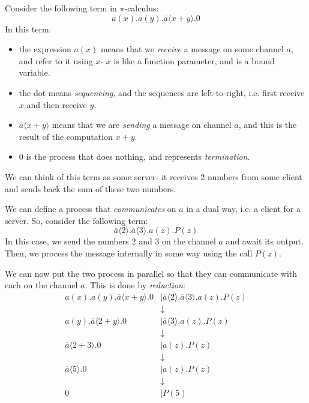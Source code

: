 \documentclass[a4paper, openany]{memoir}
\theoremstyle{definition}
\begin{document}
    Consider the following term in $\pi$-calculus:
    \[a(x).a(y).\overline{a}\langle x + y \rangle.0\]
    In this term:
    \begin{itemize}
        \item the expression $a(x)$ means that we \emph{receive} a message on some channel $a$, and refer to it using $x$- $x$ is like a function parameter, and is a bound variable.
        \item the dot means \emph{sequencing}, and the sequences are left-to-right, i.e. first receive $x$ and then receive $y$.
        \item $\overline{a} \langle x + y \rangle$ means that we are \emph{sending} a message on channel $a$, and this is the result of the computation $x + y$.
        \item $0$ is the process that does nothing, and represents \emph{termination}.
    \end{itemize}
    We can think of this term as some server- it receives 2 numbers from some client and sends back the sum of these two numbers.

    We can define a process that \emph{communicates} on $a$ in a dual way, i.e. a client for a server. So, consider the following term:
    \[\overline{a} \langle 2 \rangle.\overline{a} \langle 3 \rangle.a(z).P(z)\]
    In this case, we send the numbers 2 and 3 on the channel $a$ and await its output. Then, we process the message internally in some way using the call $P(z)$.

    We can now put the two process in parallel so that they can communicate with each on the channel $a$. This is done by \emph{reduction}:
    \begin{align*}
        a(x).a(y).\overline{a} \langle x + y \rangle.0 &\mid \overline{a} \langle 2 \rangle.\overline{a} \langle 3 \rangle.a(z).P(z) \\
        &\downarrow \\
        a(y).\overline{a} \langle 2 + y \rangle.0 &\mid \overline{a} \langle 3 \rangle.a(z).P(z) \\
        &\downarrow \\
        \overline{a} \langle 2 + 3 \rangle.0 &\mid a(z).P(z) \\
        &\downarrow \\
        \overline{a} \langle 5 \rangle.0 &\mid a(z).P(z) \\
        &\downarrow \\
        0 &\mid P(5)
    \end{align*}
\end{document}
